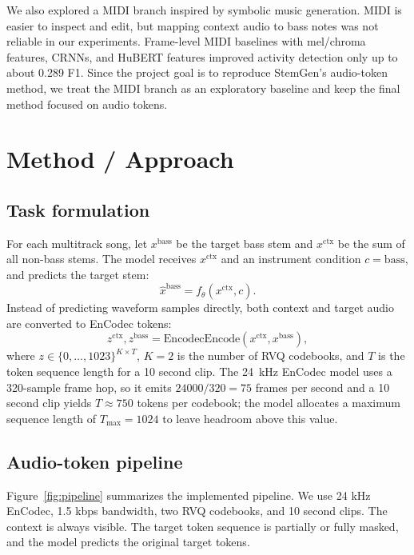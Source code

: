 \documentclass{article}
\begin{document}
We also explored a MIDI branch inspired by symbolic music generation. MIDI is easier to inspect and edit, but mapping context audio to bass notes was not reliable in our experiments. Frame-level MIDI baselines with mel/chroma features, CRNNs, and HuBERT features improved activity detection only up to about 0.289 F1. Since the project goal is to reproduce StemGen's audio-token method, we treat the MIDI branch as an exploratory baseline and keep the final method focused on audio tokens.

\section{Method / Approach}

\subsection{Task formulation}

For each multitrack song, let $x^{\mathrm{bass}}$ be the target bass stem and $x^{\mathrm{ctx}}$ be the sum of all non-bass stems. The model receives $x^{\mathrm{ctx}}$ and an instrument condition $c=\mathrm{bass}$, and predicts the target stem:
\begin{equation}
    \hat{x}^{\mathrm{bass}} = f_\theta(x^{\mathrm{ctx}}, c).
\end{equation}
Instead of predicting waveform samples directly, both context and target audio are converted to EnCodec tokens:
\begin{equation}
    z^{\mathrm{ctx}}, z^{\mathrm{bass}} = \mathrm{EncodecEncode}(x^{\mathrm{ctx}}, x^{\mathrm{bass}}),
\end{equation}
where $z \in \{0,\ldots,1023\}^{K \times T}$, $K=2$ is the number of RVQ codebooks, and $T$ is the token sequence length for a 10 second clip. The 24~kHz EnCodec model uses a 320-sample frame hop, so it emits $24000/320 = 75$ frames per second and a 10 second clip yields $T \approx 750$ tokens per codebook; the model allocates a maximum sequence length of $T_{\max}=1024$ to leave headroom above this value.

\subsection{Audio-token pipeline}

Figure~\ref{fig:pipeline} summarizes the implemented pipeline. We use 24 kHz EnCodec, 1.5 kbps bandwidth, two RVQ codebooks, and 10 second clips. The context is always visible. The target token sequence is partially or fully masked, and the model predicts the original target tokens.
\end{document}
